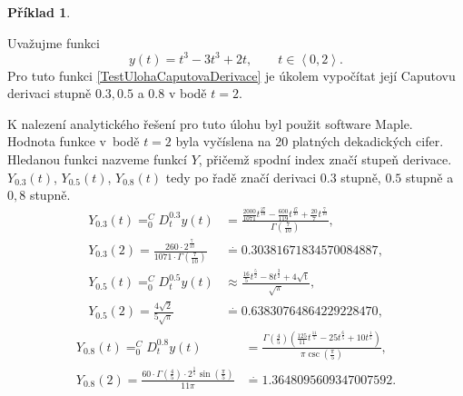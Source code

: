 \documentclass[a4paper,12pt,twoside]{article}
\theoremstyle{definition}
\newtheorem{prikl}[veta]{Příklad}
\theoremstyle{remark}
\numberwithin{equation}{section}
\numberwithin{table}{section}
\numberwithin{figure}{section}
\begin{document}
\newpage
\newpage
\begin{prikl}\label{TestUlohaL1Metoda}

Uvažujme funkci 
\begin{equation} \label{TestUlohaCaputovaDerivace}
	y\left(t\right) = t^{3} - 3t^{3} + 2t, \qquad t \in \left\langle 0, 2\right\rangle.
\end{equation}
Pro tuto funkci \eqref{TestUlohaCaputovaDerivace} je úkolem vypočítat její Caputovu derivaci stupně $0.3, 0.5$ a $0.8$ v bodě $t = 2$.

K nalezení analytického řešení pro tuto úlohu byl použit software Maple. Hodnota funkce v~bodě $t = 2$ byla vyčíslena na 20 platných dekadických cifer. Hledanou funkci nazveme funkcí $Y$, přičemž spodní index značí stupeň derivace. $Y_{0.3}\left(t\right)$, $Y_{0.5}\left(t\right)$, $Y_{0.8}\left(t\right)$ tedy po řadě značí derivaci $0.3$ stupně, $0.5$ stupně a $0,8$ stupně.
\begin{equation}
	\begin{aligned}
		Y_{0.3}\left(t\right) = ^{C}_{0}D^{0.3}_{t} y\left(t\right) &=  \frac{\frac{2000}{1071}t^{\frac{27}{10}}-\frac{600 }{119}t^{\frac{17}{10}}+\frac{20}{7}t^{\frac{7}{10}}}{\Gamma \! \left(\frac{7}{10}\right)}, \\
		Y_{0.3}\left(2\right) = \frac{260\cdot2^{\frac{7}{10}}}{1071\cdot\Gamma\left(\frac{7}{10}\right)} 	&\overset{.}{=}  0.30381671834570084887,	
	\end{aligned}
\end{equation}
\begin{equation}
	\begin{aligned}
		Y_{0.5}\left(t\right) = ^{C}_{0}D^{0.5}_{t} y\left(t\right) &\approx   \frac{\frac{16}{5}t^{\frac{5}{2}}-8 t^{\frac{3}{2}}+4 \mathrm{\sqrt{t}}}{\sqrt{\pi}}, \\
		Y_{0.5}\left(2\right) = \frac{4 \sqrt{2}}{5 \sqrt{\pi}}&\overset{.}{=}   0.63830764864229228470,
	\end{aligned}
\end{equation}
\begin{equation}
	\begin{aligned}
		Y_{0.8}\left(t\right) = ^{C}_{0}D^{0.8}_{t} y\left(t\right) &=   \frac{\Gamma \! \left(\frac{4}{5}\right) \left(\frac{125 }{11}t^{\frac{11}{5}}-25 t^{\frac{6}{5}}+10 t^{\frac{1}{5}}\right)}{\pi  \csc\! \left(\frac{\pi}{5}\right)}, \\
		Y_{0.8}\left(2\right) =\frac{60 \cdot \Gamma \! \left(\frac{4}{5}\right) \cdot 2^{\frac{1}{5}} \sin \left(\frac{\pi}{5}\right)}{11 \pi }	&\overset{.}{=}  1.3648095609347007592.
	\end{aligned}
\end{equation}


\end{prikl}
\end{document}
